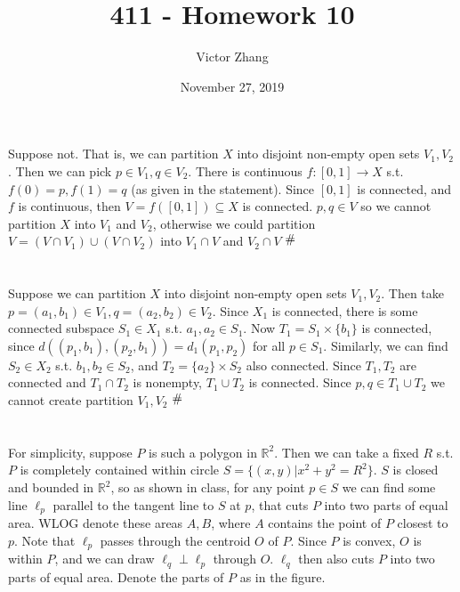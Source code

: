 \documentclass{article}
\title{411 - Homework 10}
\author{Victor Zhang }
\date{November 27, 2019}
\newcommand{\contra}{\raisebox{\depth}{\#}}
\begin{document}
\maketitle

\section{}
Suppose not. That is, we can partition $X$ into disjoint non-empty open sets $V_1,V_2$. Then we can pick $p \in V_1, q \in V_2$. There is continuous $f: [0,1] \rightarrow X$ s.t. $f(0) = p, f(1) = q$ (as given in the statement). Since $[0,1]$ is connected, and $f$ is continuous, then $V = f([0,1]) \subseteq X$ is connected. $p,q \in V$ so we cannot partition $X$ into $V_1$ and $V_2$, otherwise we could partition $V = (V\cap V_1)\cup(V\cap V_2)$ into $V_1\cap V$ and $V_2\cap V$ $\contra$

\section{}
Suppose we can partition $X$ into disjoint non-empty open sets $V_1,V_2$. Then take $p = (a_1,b_1)\in V_1, q=(a_2,b_2)\in V_2$. Since $X_1$ is connected, there is some connected subspace $S_1 \in X_1$ s.t. $a_1,a_2 \in S_1$. Now $T_1 = S_1\times \{b_1\}$ is connected, since $d((p_1,b_1),(p_2,b_1)) = d_1(p_1,p_2)$ for all $p\in S_1$. Similarly, we can find $S_2 \in X_2$ s.t. $b_1,b_2 \in S_2$, and $T_2 = \{a_2\}\times S_2$ also connected. Since $T_1,T_2$ are connected and $T_1 \cap T_2$ is nonempty, $T_1 \cup T_2$ is connected. Since $p,q \in T_1\cup T_2$ we cannot create partition $V_1,V_2$ $\contra$

\section{}
For simplicity, suppose $P$ is such a polygon in $\mathbb{R}^2$. Then we can take a fixed $R$ s.t. $P$ is completely contained within circle $S = \{(x,y) | x^2+y^2 = R^2\}$. $S$ is closed and bounded in $\mathbb{R}^2$, so as shown in class, for any point $p\in S$ we can find some line $\ell_p$ parallel to the tangent line to $S$ at $p$, that cuts $P$ into two parts of equal area. WLOG denote these areas $A,B$, where $A$ contains the point of $P$ closest to $p$. Note that $\ell_p$ passes through the centroid $O$ of $P$. Since $P$ is convex, $O$ is within $P$, and we can draw $\ell_q \perp \ell_p$ through $O$. $\ell_q$ then also cuts $P$ into two parts of equal area. Denote the parts of $P$ as in the figure.
\end{document}
